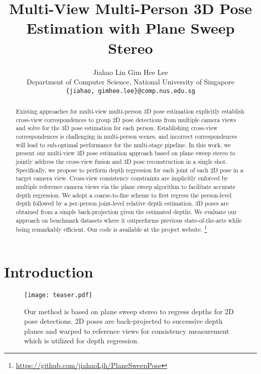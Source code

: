 \documentclass[final]{cvpr}
\begin{document}
\title{Multi-View Multi-Person 3D Pose Estimation with Plane Sweep Stereo}

\author{Jiahao Lin {} {} {} {} {} {} {} {} Gim Hee Lee\\
Department of Computer Science, National University of Singapore\\
{\tt\small \{jiahao, gimhee.lee\}@comp.nus.edu.sg}
}

\maketitle


\begin{abstract}

Existing approaches for multi-view multi-person 3D pose estimation explicitly establish cross-view correspondences to group 2D pose detections from multiple camera views and solve for the 3D pose estimation for each person.
Establishing cross-view correspondences is challenging in multi-person scenes, and incorrect correspondences will lead to sub-optimal performance for the multi-stage pipeline.
In this work, we present our multi-view 3D pose estimation approach based on plane sweep stereo to jointly address the cross-view fusion and 3D pose reconstruction in a single shot.
Specifically, we propose to perform depth regression for each joint of each 2D pose in a target camera view.
Cross-view consistency constraints are implicitly enforced by multiple reference camera views via the plane sweep algorithm to facilitate accurate depth regression.
We adopt a coarse-to-fine scheme to first regress the person-level depth followed by a per-person joint-level relative depth estimation.
3D poses are obtained from a simple back-projection given the estimated depths.
We evaluate our approach on benchmark datasets where it outperforms previous state-of-the-arts while being remarkably efficient.
Our code is available at the project website. \footnote{\url{https://github.com/jiahaoLjh/PlaneSweepPose}}

\end{abstract}

\section{Introduction}

\FloatBarrier
\begin{figure}[t]
    \centering
    \texttt{[image: teaser.pdf]}
    \caption{Our method is based on plane sweep stereo to regress depths for 2D pose detections. 2D poses are back-projected to successive depth planes and warped to reference views for consistency measurement which is utilized for depth regression.}
    \label{fig:teaser}
    \vspace{-1mm}
\end{figure}
\end{document}
